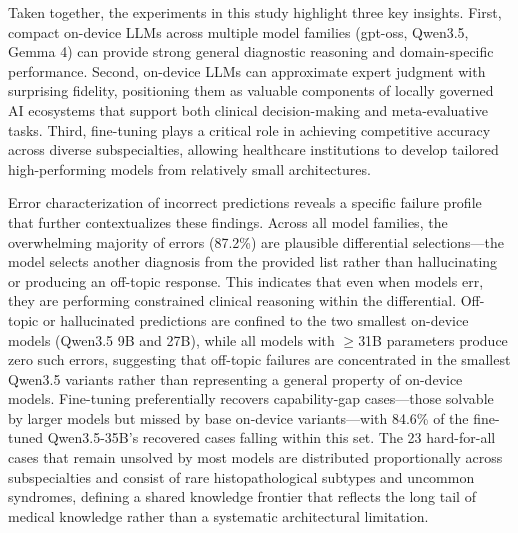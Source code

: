 \documentclass[10pt,journal,compsoc, onecolumn]{IEEEtran}
\begin{document}
Taken together, the experiments in this study highlight three key insights. First, compact on-device LLMs across multiple model families (gpt-oss, Qwen3.5, Gemma 4) can provide strong general diagnostic reasoning and domain-specific performance. Second, on-device LLMs can approximate expert judgment with surprising fidelity, positioning them as valuable components of locally governed AI ecosystems that support both clinical decision-making and meta-evaluative tasks. Third, fine-tuning plays a critical role in achieving competitive accuracy across diverse subspecialties, allowing healthcare institutions to develop tailored high-performing models from relatively small architectures.

Error characterization of incorrect predictions reveals a specific failure profile that further contextualizes these findings. Across all model families, the overwhelming majority of errors (87.2\%) are plausible differential selections---the model selects another diagnosis from the provided list rather than hallucinating or producing an off-topic response. This indicates that even when models err, they are performing constrained clinical reasoning within the differential. Off-topic or hallucinated predictions are confined to the two smallest on-device models (Qwen3.5 9B and 27B), while all models with $\geq$31B parameters produce zero such errors, suggesting that off-topic failures are concentrated in the smallest Qwen3.5 variants rather than representing a general property of on-device models. Fine-tuning preferentially recovers capability-gap cases---those solvable by larger models but missed by base on-device variants---with 84.6\% of the fine-tuned Qwen3.5-35B's recovered cases falling within this set. The 23 hard-for-all cases that remain unsolved by most models are distributed proportionally across subspecialties and consist of rare histopathological subtypes and uncommon syndromes, defining a shared knowledge frontier that reflects the long tail of medical knowledge rather than a systematic architectural limitation.
\end{document}
